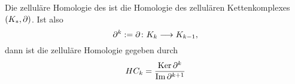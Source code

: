 \begin{definition}
    Die zelluläre Homologie des ist die Homologie des zellulären Kettenkomplexes $(K_{\ast}, { \partial })$.
    Ist also
    \[ { \partial }^k := { \partial } \colon K_k \longrightarrow K_{k - 1} , \]
    dann ist die zelluläre Homologie gegeben durch 
    \[ HC_k = \frac{ { \operatorname{Ker} } \, { \partial }^k }{ { \operatorname{Im} } \, { \partial }^{k + 1} } \]
\end{definition}
